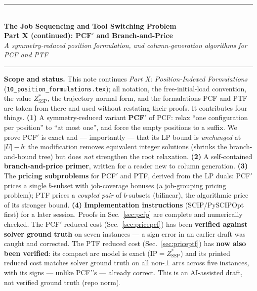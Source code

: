 \documentclass[11pt,a4paper]{article}
\theoremstyle{plain}
\theoremstyle{definition}
\newcommand{\ZSSP}{Z_{\mathrm{SSP}}^{*}}
\begin{document}
\begin{center}
  {\color{navyblue}\rule{\textwidth}{2pt}}\\[0.4cm]
  {\LARGE\bfseries\color{navyblue}The Job Sequencing and Tool Switching Problem}\\[0.2cm]
  {\large\bfseries\color{navyblue}Part X (continued): PCF$'$ and Branch-and-Price}\\[0.1cm]
  {\large\itshape\color{midblue}A symmetry-reduced position formulation, and column-generation
   algorithms for PCF and PTF}\\[0.3cm]
  {\color{navyblue}\rule{\textwidth}{2pt}}
\end{center}

\vspace{0.3cm}
\begin{mdframed}[backgroundcolor=lightblue,linecolor=navyblue,linewidth=1pt,
  innerleftmargin=14pt,innerrightmargin=14pt,innertopmargin=8pt,innerbottommargin=8pt]
\small\textbf{Scope and status.} This note continues \emph{Part X: Position-Indexed
Formulations} (\texttt{10\_position\_formulations.tex}); all notation, the free-initial-load
convention, the value $\ZSSP$, the trajectory normal form, and the formulations PCF and PTF
are taken from there and used without restating their proofs. It contributes four things.
\textbf{(1)} A symmetry-reduced variant \textbf{PCF$'$} of PCF: relax ``one configuration per
position'' to ``at most one'', and force the empty positions to a suffix. We prove PCF$'$ is
exact and --- importantly --- that its LP bound is \emph{unchanged} at $|U|-b$: the
modification removes equivalent integer solutions (shrinks the branch-and-bound tree) but does
\emph{not} strengthen the root relaxation. \textbf{(2)} A self-contained
\textbf{branch-and-price primer}, written for a reader new to column generation.
\textbf{(3)} The \textbf{pricing subproblems} for PCF$'$ and PTF, derived from the LP duals:
PCF$'$ prices a single $b$-subset with job-coverage bonuses (a job-grouping pricing problem);
PTF prices a \emph{coupled pair} of $b$-subsets (bilinear), the algorithmic price of its
stronger bound. \textbf{(4)} \textbf{Implementation instructions} (SCIP/PySCIPOpt first) for a
later session. Proofs in Sec.~\ref{sec:pcfp} are complete and numerically checked. The PCF$'$ reduced cost
(Sec.~\ref{sec:pricepcf}) has been \textbf{verified against solver ground truth} on seven
instances --- a sign error in an earlier draft was caught and corrected. The PTF reduced cost
(Sec.~\ref{sec:priceptf}) has \textbf{now also been verified}: its compact arc model is exact
($\mathrm{IP}=\ZSSP$) and its printed reduced cost matches solver ground truth on all non-$\bot$
arcs across five instances, with its signs --- unlike PCF$'$'s --- already correct.
This is an AI-assisted draft, not verified ground truth (repo norm).
\end{mdframed}
\end{document}
